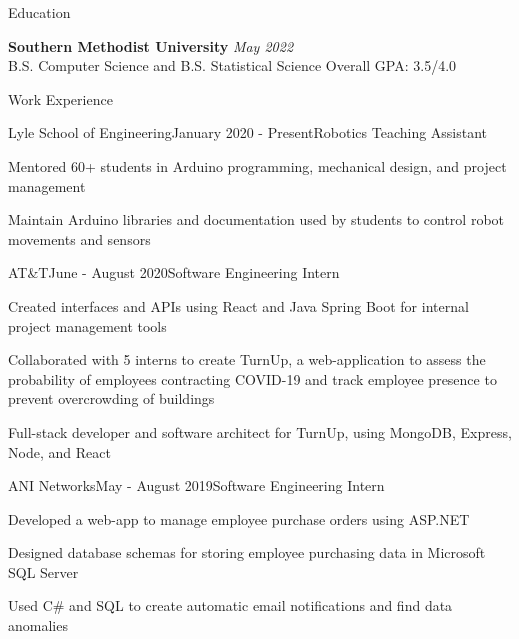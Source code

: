 \documentclass{resume} %
\begin{document}

\begin{rSection}{Education}

{\bf Southern Methodist University} \hfill {\em May 2022}
\\ B.S. Computer Science and B.S. Statistical Science \hfill { Overall GPA: 3.5/4.0}

\end{rSection}


\begin{rSection}{Work Experience}
    \begin{rSubsection}{Lyle School of Engineering}{January 2020 - Present}{Robotics Teaching Assistant}{}
        \item Mentored 60+ students in Arduino programming, mechanical design, and project management
        \item Maintain Arduino libraries and documentation used by students to control robot movements and sensors
    \end{rSubsection}
    
    \begin{rSubsection}{AT\&T}{June - August 2020}{Software Engineering Intern}{}
        \item Created interfaces and APIs using React and Java Spring Boot for internal project management tools
        \item Collaborated with 5 interns to create TurnUp, a web-application to assess the probability of employees contracting COVID-19 and track employee presence to prevent overcrowding of buildings
        \item Full-stack developer and software architect for TurnUp, using MongoDB, Express, Node, and React
    \end{rSubsection}

    \begin{rSubsection}{ANI Networks}{May - August 2019}{Software Engineering Intern}{}
        \item Developed a web-app to manage employee purchase orders using ASP.NET
        \item Designed database schemas for storing employee purchasing data in Microsoft SQL Server
        \item Used C\# and SQL to create automatic email notifications and find data anomalies
    \end{rSubsection}
\end{rSection}
\end{document}
